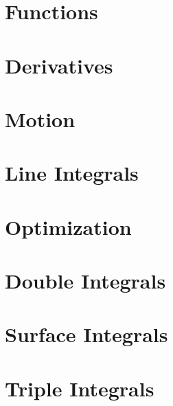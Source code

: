\documentclass[letterpaper,oneside]{book}%
\newcommand{\wrapup}{
\bmw{\section{Wrap Up}
Once you have finished the problems in the section and feel comfortable with the ideas, create a short one page lesson plan that contains examples of the key ideas.  You will get a chance to teach from this lesson plan prior to taking the exam. Then log on to Brainhoney and download the quiz. Once you have taken the quiz, you can upload your work back to brainhoney and then download the key to see how you did. If you still need to work on mastering some of the ideas, please do so and then demonstrate your mastery though the quiz corrections.}
}
\newcommand{\bmw}[1]{}
\theoremstyle{plain}
\theoremstyle{box}
\begin{document}
\chapter{Functions}

\wrapup

\chapter{Derivatives}

\wrapup

\chapter{Motion}
\chapter{Line Integrals}
\chapter{Optimization}

\chapter{Double Integrals}
\chapter{Surface Integrals}
\chapter{Triple Integrals}
\end{document}

